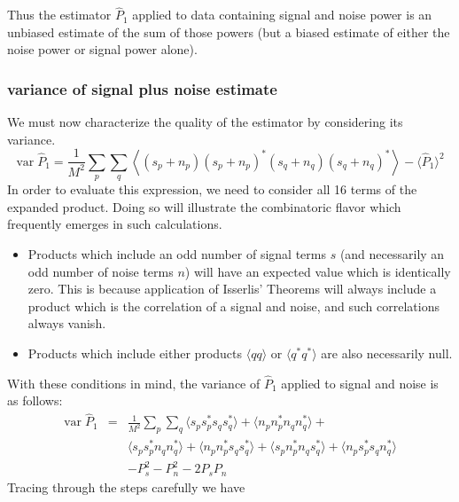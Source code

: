 Thus the estimator $\hat{P}_1$ applied to data containing signal and
noise power is an unbiased estimate of the sum of those powers (but a
biased estimate of either the noise power or signal power alone).

\subsubsection{variance of signal plus noise estimate}

We must now characterize the quality of the estimator by considering
its variance.
\begin{equation} 
\textrm{var}\;\hat{P}_1 = \frac{1}{M^2} \sum_p \sum_q 
\left\langle (s_p + n_p)(s_p + n_p)^\ast(s_q + n_q)(s_q + n_q)^\ast 
\right\rangle - \langle \hat{P}_1 \rangle^2
\end{equation}
In order to evaluate this expression, we need to consider all 16 terms
of the expanded product.  Doing so will illustrate the combinatoric
flavor which frequently emerges in such calculations.
\begin{itemize}
\item Products which include an odd number of signal terms $s$ (and
  necessarily an odd number of noise terms $n$) will have an expected
  value which is identically zero.  This is because application of
  Isserlis' Theorems will always include a product which is the
  correlation of a signal and noise, and such correlations always vanish.
  \item Products which include either products $\langle qq \rangle$ or
  $\langle q^\ast q^\ast \rangle$ are also necessarily null.
\end{itemize}
With these conditions in mind, the variance of $\hat{P}_1$ applied to
signal and noise is as follows:
\begin{eqnarray} 
\textrm{var}\;\hat{P}_1 &=& \frac{1}{M^2} \sum_p \sum_q 
  \langle s_p s_p^\ast s_q s_q^\ast \rangle
+ \langle n_p n_p^\ast n_q n_q^\ast \rangle + \nonumber \\
& & \langle s_p s_p^\ast n_q n_q^\ast \rangle
    + \langle n_p n_p^\ast s_q s_q^\ast \rangle
    + \langle s_p n_p^\ast n_q s_q^\ast \rangle
    + \langle n_p s_p^\ast s_q n_q^\ast \rangle \nonumber \\
& & - P_s^2 - P_n^2 - 2P_s P_n 
\end{eqnarray}
Tracing through the steps carefully we have
